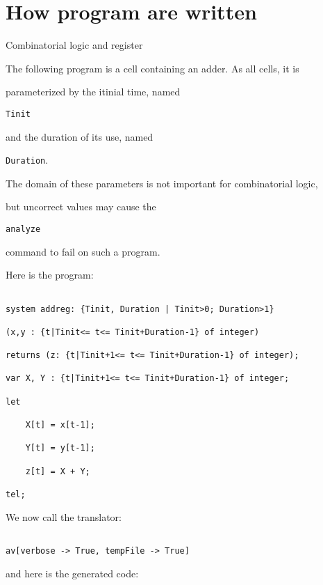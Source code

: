 \section{How \alphard{} program are written}



Combinatorial logic and register



The following program is a cell containing an adder. As all cells, it is 

parameterized by the itinial time, named 

\texttt{Tinit}

and the duration of its use, named

\texttt{Duration}. 



The domain of these parameters is not important for combinatorial logic, 

but uncorrect values may cause the 

\texttt{analyze} 

command to fail on such a program.

Here is the program: 

\begin{verbatim}

system addreg: {Tinit, Duration | Tinit>0; Duration>1} 

(x,y : {t|Tinit<= t<= Tinit+Duration-1} of integer)

returns (z: {t|Tinit+1<= t<= Tinit+Duration-1} of integer);

var X, Y : {t|Tinit+1<= t<= Tinit+Duration-1} of integer;

let

	X[t] = x[t-1]; 

	Y[t] = y[t-1];

	z[t] = X + Y;

tel;

\end{verbatim}

We now call the translator:

\begin{verbatim}

av[verbose -> True, tempFile -> True]

\end{verbatim}

and here is the generated \vhdl{} code: 

